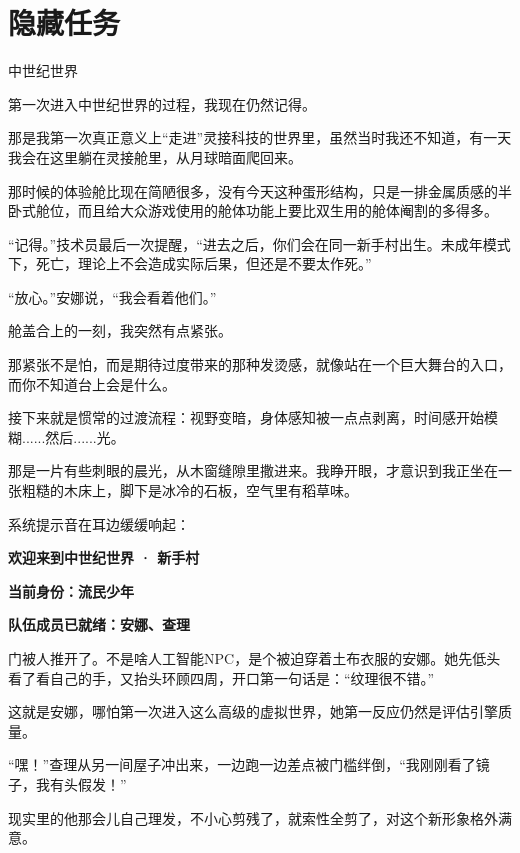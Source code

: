 \chapter{隐藏任务}

中世纪世界

第一次进入中世纪世界的过程，我现在仍然记得。

那是我第一次真正意义上“走进”灵接科技的世界里，虽然当时我还不知道，有一天我会在这里躺在灵接舱里，从月球暗面爬回来。

那时候的体验舱比现在简陋很多，没有今天这种蛋形结构，只是一排金属质感的半卧式舱位，而且给大众游戏使用的舱体功能上要比双生用的舱体阉割的多得多。

“记得。”技术员最后一次提醒，“进去之后，你们会在同一新手村出生。未成年模式下，死亡，理论上不会造成实际后果，但还是不要太作死。”

“放心。”安娜说，“我会看着他们。”

舱盖合上的一刻，我突然有点紧张。

那紧张不是怕，而是期待过度带来的那种发烫感，就像站在一个巨大舞台的入口，而你不知道台上会是什么。

接下来就是惯常的过渡流程：视野变暗，身体感知被一点点剥离，时间感开始模糊......然后......光。

那是一片有些刺眼的晨光，从木窗缝隙里撒进来。我睁开眼，才意识到我正坐在一张粗糙的木床上，脚下是冰冷的石板，空气里有稻草味。

系统提示音在耳边缓缓响起：

\begin{center}
\textbf{欢迎来到中世纪世界 · 新手村}
\end{center}

\begin{center}
\textbf{当前身份：流民少年}
\end{center}

\begin{center}
\textbf{队伍成员已就绪：安娜、查理}
\end{center}

门被人推开了。不是啥人工智能NPC，是个被迫穿着土布衣服的安娜。她先低头看了看自己的手，又抬头环顾四周，开口第一句话是：“纹理很不错。”

这就是安娜，哪怕第一次进入这么高级的虚拟世界，她第一反应仍然是评估引擎质量。

“嘿！”查理从另一间屋子冲出来，一边跑一边差点被门槛绊倒，“我刚刚看了镜子，我有头假发！”

现实里的他那会儿自己理发，不小心剪残了，就索性全剪了，对这个新形象格外满意。

